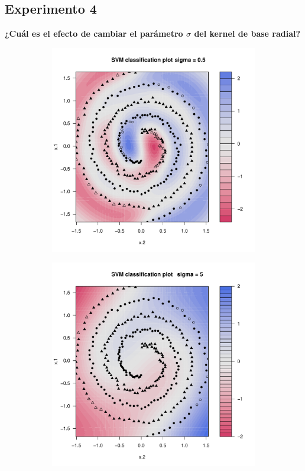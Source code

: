 \subsection*{Experimento 4}

\textbf{¿Cuál es el efecto de cambiar el parámetro $\sigma$ del kernel de base radial?}

\begin{figure}[H]
	\centering
	\begin{subfigure}{0.24\linewidth}
		\includegraphics[width=1\linewidth]{Graphics/Problema_01/Experiment_04_1.pdf}
		\caption{}
	\end{subfigure}
	\begin{subfigure}{0.24\linewidth}
		\includegraphics[width=1\linewidth]{Graphics/Problema_01/Experiment_04_2.pdf}

\end{subfigure}
\end{figure}
